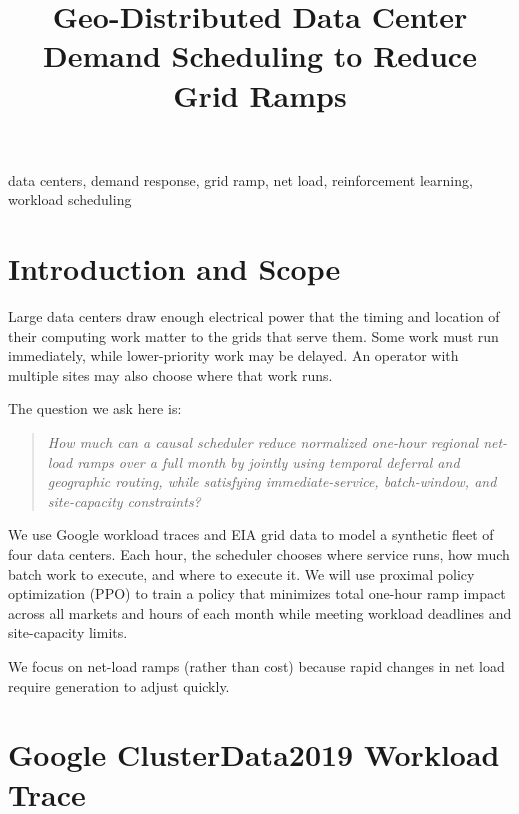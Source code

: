 \documentclass[conference]{IEEEtran}
\begin{document}
\title{Geo-Distributed Data Center Demand Scheduling to Reduce Grid Ramps}

\author{
}

\maketitle

\begin{IEEEkeywords}
data centers, demand response, grid ramp, net load, reinforcement learning,
workload scheduling
\end{IEEEkeywords}

\section{Introduction and Scope}
\label{sec:introduction}

Large data centers draw enough electrical power that the timing and location 
of their computing work matter to the grids that serve them. Some work must
run immediately, while lower-priority work may be delayed. An operator with
multiple sites may also choose where that work runs.

The question we ask here is:
\begin{quote}
\emph{How much can a
causal scheduler reduce normalized one-hour regional net-load ramps over a
full month by jointly using temporal deferral and geographic routing, while
satisfying immediate-service, batch-window, and site-capacity constraints?}
\end{quote}

We use Google workload traces and EIA grid data to model a synthetic fleet
of four data centers. Each hour, the scheduler chooses where service runs,
how much batch work to execute, and where to execute it. We will use
proximal policy optimization (PPO) to train a policy that minimizes
total one-hour ramp impact across all markets and hours of each month while
meeting workload deadlines and site-capacity limits.

We focus on net-load ramps (rather than cost) because rapid changes in net load require
generation to adjust quickly.

\section{Google ClusterData2019 Workload Trace}
\label{sec:clusterdata2019}
\end{document}
